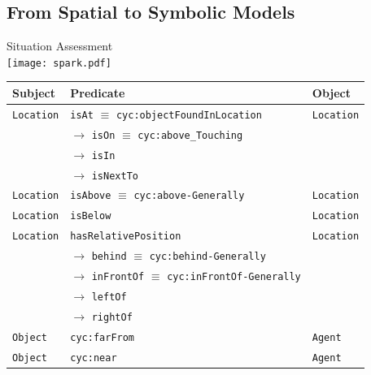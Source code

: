 \documentclass[compress]{beamer}
\newcommand{\concept}[1]{{\scriptsize \texttt{#1}}}
\begin{document}
\subsection{From Spatial to Symbolic Models}
\begin{frame}{Situation Assessment}
        \centering
        \\
        \vspace*{1em}
        \texttt{[image: spark.pdf]}

\end{frame}

\begin{frame}{}
        \centering
        \scriptsize

        \begin{tabular}{p{1.5cm}lp{2cm}}
            Subject & Predicate  & Object  \\ 
            \hline
            \concept{Location} & \concept{isAt} $\equiv$ \concept{cyc:objectFoundInLocation}  &  \concept{Location}  \\ 
                               &  $\rightarrow$ \concept{isOn} $\equiv$ \concept{cyc:above\_Touching}  &   \\ 
                               &  $\rightarrow$ \concept{isIn}  &   \\ 
                               &  $\rightarrow$ \concept{isNextTo}  &   \\ 

            \concept{Location}  & \concept{isAbove} $\equiv$ \concept{cyc:above-Generally}  &  \concept{Location} \\ 
            \concept{Location}  & \concept{isBelow}  & \concept{Location} \\
            \hline
            \concept{Location}  & \concept{hasRelativePosition}  & \concept{Location}  \\ 
                                   & 	$\rightarrow$ \concept{behind} $\equiv$ \concept{cyc:behind-Generally}  & \\ 
                                      &  $\rightarrow$ \concept{inFrontOf} $\equiv$ \concept{cyc:inFrontOf-Generally}  & \\ 
                                         &  $\rightarrow$ \concept{leftOf}  &  \\ 
                                            &  $\rightarrow$ \concept{rightOf}  & 	 \\ 
            \concept{Object}  & \concept{cyc:farFrom}  &  \concept{Agent} \\ 
            \concept{Object}  & \concept{cyc:near}  &  \concept{Agent} \\


\end{tabular}
\end{frame}
\end{document}

